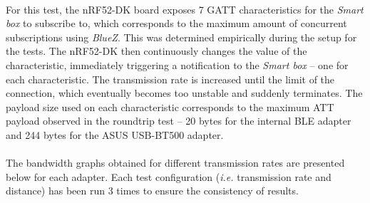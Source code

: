 \paragraph{} For this test, the nRF52-DK board exposes 7 \acs{GATT} characteristics for the \textit{Smart box} to subscribe to, which corresponds to the maximum amount of concurrent subscriptions using \textit{BlueZ}. This was determined empirically during the setup for the tests. The nRF52-DK then continuously changes the value of the characteristic, immediately triggering a notification to the \textit{Smart box} -- one for each characteristic. The transmission rate is increased until the limit of the connection, which eventually becomes too unstable and suddenly terminates. The payload size used on each characteristic corresponds to the maximum \acs{ATT} payload observed in the roundtrip test -- 20 bytes for the internal \acs{BLE} adapter and 244 bytes for the ASUS USB-BT500 adapter.

\paragraph{} The bandwidth graphs obtained for different transmission rates are presented below for each adapter. Each test configuration (\textit{i.e.} transmission rate and distance) has been run 3 times to ensure the consistency of results.

